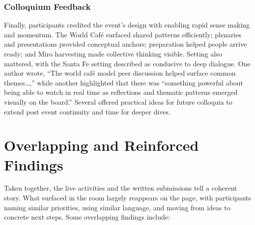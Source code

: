 \documentclass[
  letterpaper,
  DIV=11,
  numbers=noendperiod]{scrartcl}
\begin{document}
\subsubsection{Colloquium Feedback}\label{colloquium-feedback}

Finally, participants credited the event's design with enabling rapid
sense making and momentum. The World Café surfaced shared patterns
efficiently; plenaries and presentations provided conceptual anchors;
preparation helped people arrive ready; and Miro harvesting made
collective thinking visible. Setting also mattered, with the Santa Fe
setting described as conducive to deep dialogue. One author wrote, ``The
world café model peer discussion helped surface common themes\ldots,''
while another highlighted that there was ``something powerful about
being able to watch in real time as reflections and thematic patterns
emerged visually on the board.'' Several offered practical ideas for
future colloquia to extend post event continuity and time for deeper
dives.

\section{Overlapping and Reinforced
Findings}\label{overlapping-and-reinforced-findings}

Taken together, the live activities and the written submissions tell a
coherent story. What surfaced in the room largely reappears on the page,
with participants naming similar priorities, using similar language, and
moving from ideas to concrete next steps. Some overlapping findings
include:
\end{document}

